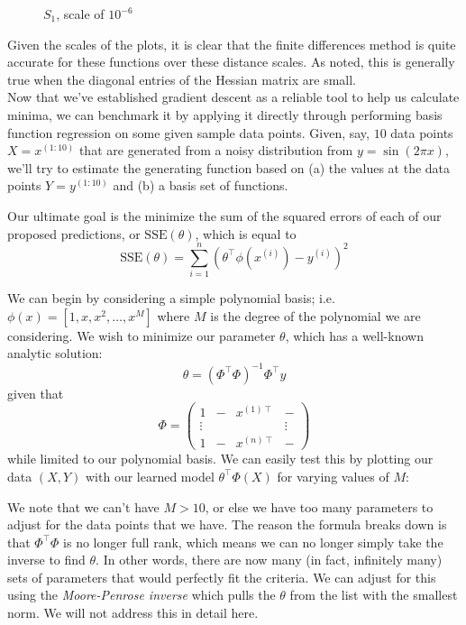 \documentclass[11pt,letterpaper]{article}
\begin{document}
\begin{figure}[!htb]
  \caption{$S_1$, scale of $10^{-6}$}\label{fig:gradDifS}
\endminipage
\end{figure}

Given the scales of the plots, it is clear that the finite differences method is quite accurate for these functions over these distance scales. As noted, this is generally true when the diagonal entries of the Hessian matrix are small.\\

Now that we've established gradient descent as a reliable tool to help us calculate minima, we can benchmark it by applying it directly through performing basis function regression on some given sample data points. Given, say, $10$ data points $X = x^{(1:10)}$ that are generated from a noisy distribution from $y = \sin(2\pi x)$, we'll try to estimate the generating function based on (a) the values at the data points $Y = y^{(1:10)}$ and (b) a basis set of functions.

Our ultimate goal is the minimize the sum of the squared errors of each of our proposed predictions, or $\text{SSE}(\theta)$, which is equal to
$$\text{SSE}(\theta) = \sum_{i=1}^n (\theta^\intercal\phi(x^{(i)}) - y^{(i)})^2$$

We can begin by considering a simple polynomial basis; i.e. $\phi(x) = [1, x, x^2, \ldots , x^M]$ where $M$ is the degree of the polynomial we are considering. We wish to minimize our parameter $\theta$, which has a well-known analytic solution:
$$\theta = (\Phi^\intercal\Phi)^{-1}\Phi^\intercal y$$
given that
$$\Phi = \left( \begin{array}{cccc}
 1 & - & x^{(1)\intercal} & - \\
 \vdots &  & & \vdots \\
 1 & - & x^{(n)\intercal} & - \end{array} \right) $$
while limited to our polynomial basis. We can easily test this by plotting our data $(X, Y)$ with our learned model $\theta^\intercal\Phi(X)$ for varying values of $M$:

We note that we can't have $M > 10$, or else we have too many parameters to adjust for the data points that we have. The reason the formula breaks down is that $\Phi^\intercal\Phi$ is no longer full rank, which means we can no longer simply take the inverse to find $\theta$. In other words, there are now many (in fact, infinitely many) sets of parameters that would perfectly fit the criteria. We can adjust for this using the \textit{Moore-Penrose inverse} which pulls the $\theta$ from the list with the smallest norm. We will not address this in detail here.
\end{document}
